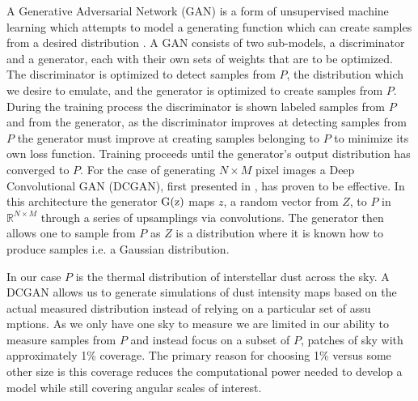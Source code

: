 \documentclass[twocolumn]{aastex62}
\begin{document}
A Generative Adversarial Network (GAN) is a form of unsupervised machine learning which attempts to model a generating function which can create samples from a desired distribution \citep{goodfellow14}. 
A GAN consists of two sub-models, a discriminator and a generator, each with their own sets of weights that are to be optimized.
The discriminator is optimized to detect samples from $P$, the distribution which we desire to emulate, and the generator is optimized to create samples from $P$.
During the training process the discriminator is shown labeled samples from $P$ and from the generator, as the discriminator improves at detecting samples from $P$ the generator must improve at creating samples belonging to $P$ to minimize its own loss function. Training proceeds until the generator's output distribution has converged to $P$.
For the case of generating $N\times M$ pixel images a Deep Convolutional GAN (DCGAN), first presented in \cite{radford15}, has proven to be effective. In this architecture the generator $\rm{G}(z)$ maps $z$, a random vector from $Z$, to $P$ in $\mathbb{R}^{N\times M}$ through a series of upsamplings via convolutions. 
The generator then allows one to sample from $P$ as $Z$ is a distribution where it is known how to produce samples i.e. a Gaussian distribution.

In our case $P$ is the thermal distribution of interstellar dust across the sky.
A DCGAN allows us to generate simulations of dust intensity maps based on the actual measured distribution instead of relying on a particular set of assu
mptions. 
As we only have one sky to measure we are limited in our ability to measure samples from $P$ and instead focus on a subset of $P$, patches of sky with approximately 1\% coverage. 
The primary reason for choosing 1\% versus some other size is this coverage reduces the computational power needed to develop a model while still covering angular scales of interest.
\end{document}
